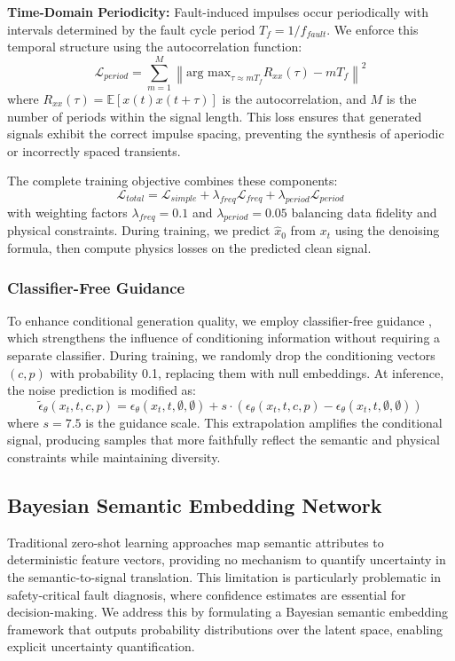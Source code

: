\documentclass[journal]{IEEEtran}
\begin{document}
\textbf{Time-Domain Periodicity:} Fault-induced impulses occur periodically with intervals determined by the fault cycle period $T_f = 1/f_{fault}$. We enforce this temporal structure using the autocorrelation function:
\begin{equation}
    \mathcal{L}_{period} = \sum_{m=1}^M \left\| \text{arg max}_{\tau \approx m T_f} R_{xx}(\tau) - m T_f \right\|^2
    \label{eq:period_loss}
\end{equation}
where $R_{xx}(\tau) = \mathbb{E}[x(t)x(t+\tau)]$ is the autocorrelation, and $M$ is the number of periods within the signal length. This loss ensures that generated signals exhibit the correct impulse spacing, preventing the synthesis of aperiodic or incorrectly spaced transients.

The complete training objective combines these components:
\begin{equation}
    \mathcal{L}_{total} = \mathcal{L}_{simple} + \lambda_{freq} \mathcal{L}_{freq} + \lambda_{period} \mathcal{L}_{period}
    \label{eq:total_loss}
\end{equation}
with weighting factors $\lambda_{freq}=0.1$ and $\lambda_{period}=0.05$ balancing data fidelity and physical constraints. During training, we predict $\hat{x}_0$ from $x_t$ using the denoising formula, then compute physics losses on the predicted clean signal.

\subsubsection{Classifier-Free Guidance}
To enhance conditional generation quality, we employ classifier-free guidance \cite{ho2022classifier}, which strengthens the influence of conditioning information without requiring a separate classifier. During training, we randomly drop the conditioning vectors $(c, p)$ with probability 0.1, replacing them with null embeddings. At inference, the noise prediction is modified as:
\begin{equation}
    \tilde{\epsilon}_\theta(x_t, t, c, p) = \epsilon_\theta(x_t, t, \emptyset, \emptyset) + s \cdot (\epsilon_\theta(x_t, t, c, p) - \epsilon_\theta(x_t, t, \emptyset, \emptyset))
    \label{eq:cfg}
\end{equation}
where $s=7.5$ is the guidance scale. This extrapolation amplifies the conditional signal, producing samples that more faithfully reflect the semantic and physical constraints while maintaining diversity.


\subsection{Bayesian Semantic Embedding Network}
Traditional zero-shot learning approaches map semantic attributes to deterministic feature vectors, providing no mechanism to quantify uncertainty in the semantic-to-signal translation. This limitation is particularly problematic in safety-critical fault diagnosis, where confidence estimates are essential for decision-making. We address this by formulating a Bayesian semantic embedding framework that outputs probability distributions over the latent space, enabling explicit uncertainty quantification.
\end{document}

